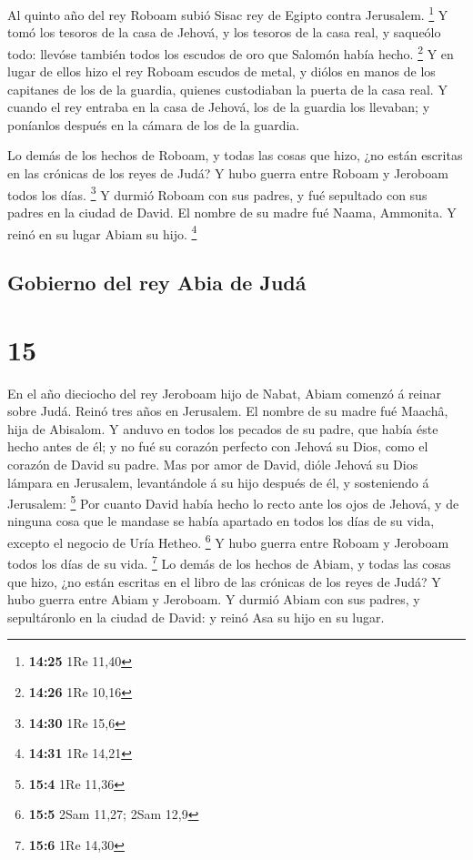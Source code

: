  Al quinto año del rey Roboam subió Sisac rey de Egipto
contra Jerusalem. \footnote{\textbf{14:25} 1Re 11,40}  Y
tomó los tesoros de la casa de Jehová, y los tesoros de la casa real, y
saqueólo todo: llevóse también todos los escudos de oro que Salomón
había hecho. \footnote{\textbf{14:26} 1Re 10,16}  Y en
lugar de ellos hizo el rey Roboam escudos de metal, y diólos en manos de
los capitanes de los de la guardia, quienes custodiaban la puerta de la
casa real.  Y cuando el rey entraba en la casa de Jehová,
los de la guardia los llevaban; y poníanlos después en la cámara de los
de la guardia.

 Lo demás de los hechos de Roboam, y todas las cosas que
hizo, ¿no están escritas en las crónicas de los reyes de Judá?
 Y hubo guerra entre Roboam y Jeroboam todos los días.
\footnote{\textbf{14:30} 1Re 15,6}  Y durmió Roboam con sus
padres, y fué sepultado con sus padres en la ciudad de David. El nombre
de su madre fué Naama, Ammonita. Y reinó en su lugar Abiam su hijo.
\footnote{\textbf{14:31} 1Re 14,21}

\hypertarget{gobierno-del-rey-abia-de-juduxe1}{%
\subsection{Gobierno del rey Abia de
Judá}\label{gobierno-del-rey-abia-de-juduxe1}}

\hypertarget{section-14}{%
\section{15}\label{section-14}}

 En el año dieciocho del rey Jeroboam hijo de Nabat, Abiam
comenzó á reinar sobre Judá.  Reinó tres años en Jerusalem.
El nombre de su madre fué Maachâ, hija de Abisalom.  Y
anduvo en todos los pecados de su padre, que había éste hecho antes de
él; y no fué su corazón perfecto con Jehová su Dios, como el corazón de
David su padre.  Mas por amor de David, dióle Jehová su Dios
lámpara en Jerusalem, levantándole á su hijo después de él, y
sosteniendo á Jerusalem: \footnote{\textbf{15:4} 1Re 11,36} 
Por cuanto David había hecho lo recto ante los ojos de Jehová, y de
ninguna cosa que le mandase se había apartado en todos los días de su
vida, excepto el negocio de Uría Hetheo. \footnote{\textbf{15:5} 2Sam
  11,27; 2Sam 12,9}  Y hubo guerra entre Roboam y Jeroboam
todos los días de su vida. \footnote{\textbf{15:6} 1Re 14,30}
 Lo demás de los hechos de Abiam, y todas las cosas que
hizo, ¿no están escritas en el libro de las crónicas de los reyes de
Judá? Y hubo guerra entre Abiam y Jeroboam.  Y durmió Abiam
con sus padres, y sepultáronlo en la ciudad de David: y reinó Asa su
hijo en su lugar.

